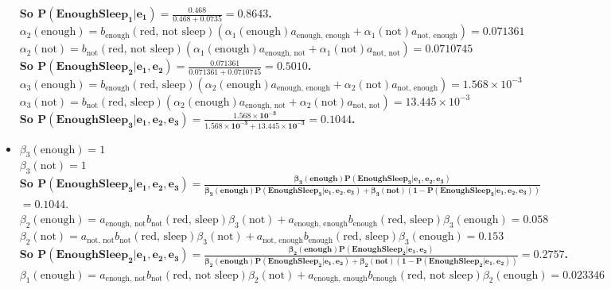\documentclass[11pt]{article}
\begin{document}
\begin{onehalfspace}
\begin{itemize}
	\textbf{So $\mathbf{P(EnoughSleep_1|e_1) = \frac{0.468}{0.468+0.0735} = 0.8643}$.}\\
	$\alpha_2(\text{enough}) = b_{\text{enough}}(\text{red, not sleep})(\alpha_1(\text{enough})a_{\text{enough, enough}} + \alpha_1(\text{not})a_{\text{not, enough}}) = 0.071361$\\
	$\alpha_2(\text{not}) = b_{\text{not}}(\text{red, not sleep})(\alpha_1(\text{enough})a_{\text{enough, not}} + \alpha_1(\text{not})a_{\text{not, not}}) = 0.0710745$\\
	\textbf{So $\mathbf{P(EnoughSleep_2|e_1,e_2) = \frac{0.071361}{0.071361+0.0710745} = 0.5010}$.}\\
	$\alpha_3(\text{enough}) = b_{\text{enough}}(\text{red, sleep})(\alpha_2(\text{enough})a_{\text{enough, enough}} + \alpha_2(\text{not})a_{\text{not, enough}}) = 1.568\times10^{-3}$\\
	$\alpha_3(\text{not}) = b_{\text{not}}(\text{red, sleep})(\alpha_2(\text{enough})a_{\text{enough, not}} + \alpha_2(\text{not})a_{\text{not, not}}) = 13.445\times10^{-3}$\\
	\textbf{So $\mathbf{P(EnoughSleep_3|e_1,e_2,e_3) = \frac{1.568\times10^{-3}}{1.568\times10^{-3}+13.445\times10^{-3}} = 0.1044}$.}\\
	\item
	$\beta_3(\text{enough}) = 1$\\
	$\beta_3(\text{not}) = 1$\\
	\textbf{So $\mathbf{P(EnoughSleep_3|e_1,e_2,e_3) = \frac{\beta_3(\text{enough})P(EnoughSleep_3|e_1,e_2,e_3)}{\beta_3(\text{enough})P(EnoughSleep_3|e_1,e_2,e_3)+\beta_3(\text{not})(1-P(EnoughSleep_3|e_1,e_2,e_3))}}$}\\$\mathbf{=0.1044}$.\\
	$\beta_2(\text{enough}) = a_{\text{enough, not}}b_{\text{not}}(\text{red, sleep})\beta_3(\text{not})+a_{\text{enough, enough}}b_{\text{enough}}(\text{red, sleep})\beta_3(\text{enough}) = 0.058$\\
	$\beta_2(\text{not}) = a_{\text{not, not}}b_{\text{not}}(\text{red, sleep})\beta_3(\text{not})+a_{\text{not, enough}}b_{\text{enough}}(\text{red, sleep})\beta_3(\text{enough}) = 0.153$\\
	\textbf{So $\mathbf{P(EnoughSleep_2|e_1,e_2,e_3) = \frac{\beta_2(\text{enough})P(EnoughSleep_2|e_1,e_2)}{\beta_2(\text{enough})P(EnoughSleep_2|e_1,e_2)+\beta_2(\text{not})(1-P(EnoughSleep_2|e_1,e_2))}=0.2757}$.}\\
	$\beta_1(\text{enough}) = a_{\text{enough, not}}b_{\text{not}}(\text{red, not sleep})\beta_2(\text{not})+a_{\text{enough, enough}}b_{\text{enough}}(\text{red, not sleep})\beta_2(\text{enough}) = 0.023346$\\

\end{itemize}
\end{onehalfspace}
\end{document}

